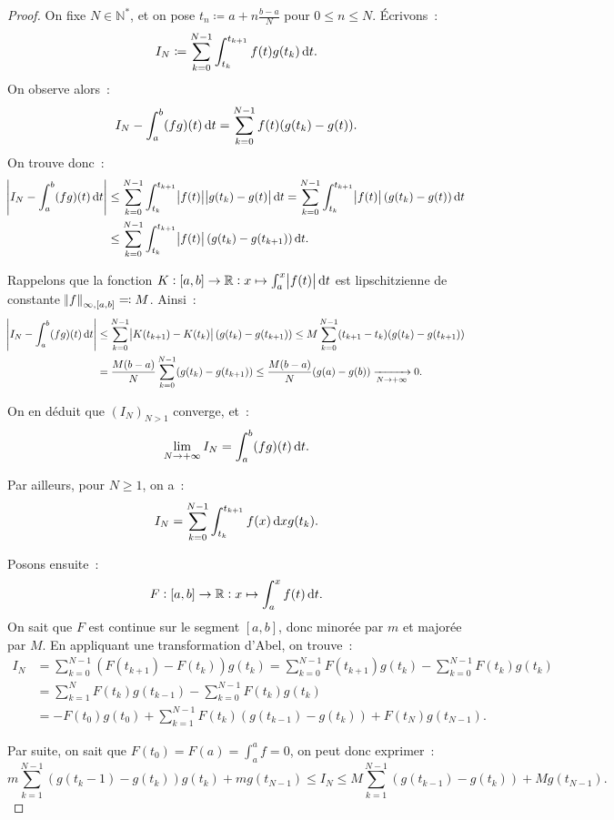\documentclass{report}
\theoremstyle{definition}
\theoremstyle{remark}
\newcommand{\R}{\mathbb R}
\newcommand{\N}{\mathbb N}
\newcommand{\Ns}{\N^{*}}
\newcommand{\pinfty}{{+\infty}}
\begin{document}
			\begin{proof} On fixe $N \in \Ns$, et on pose $t_n \coloneqq a + n\frac {b-a}N$ pour $0 \leq n \leq N$. Écrivons~:
			\[I_N \coloneqq \sum_{k=0}^{N-1}\int_{t_k}^{t_{k+1}}f(t)g(t_k)\dif t.\]
			On observe alors~:
			\[I_N - \int_a^b(fg)(t)\dif t = \sum_{k=0}^{N-1}f(t)(g(t_k) - g(t)).\]
			On trouve donc~:
			\begin{align*}
				\abs {I_N - \int_a^b(fg)(t)\dif t} &\leq \sum_{k=0}^{N-1} \int_{t_k}^{t_{k+1}}\abs {f(t)}\abs {g(t_k) - g(t)}\dif t
					= \sum_{k=0}^{N-1}\int_{t_k}^{t_{k+1}}\abs {f(t)}(g(t_k) - g(t))\dif t \\
				&\leq \sum_{k=0}^{N-1}\int_{t_k}^{t_{k+1}}\abs {f(t)}(g(t_k)-g(t_{k+1}))\dif t.
			\end{align*}

			Rappelons que la fonction $K : [a, b] \to \R : x \mapsto \int_a^x\abs {f(t)}\dif t$ est lipschitzienne de constante $\norm f_{\infty, [a, b]} \eqqcolon M$.
			Ainsi~:
			\begin{align*}
				\abs {I_N - \int_a^b(fg)(t)\dif t} &\leq \sum_{k=0}^{N-1}\abs {K(t_{k+1}) - K(t_k)}(g(t_k)-g(t_{k+1}))
					\leq M\sum_{k=0}^{N-1}(t_{k+1}-t_k)(g(t_k)-g(t_{k+1})) \\
				&= \frac {M(b-a)}N\sum_{k=0}^{N-1}(g(t_k) - g(t_{k+1})) \leq \frac {M(b-a)}N(g(a)-g(b)) \xrightarrow[N \to \pinfty]{} 0.
			\end{align*}

			On en déduit que $(I_N)_{N > 1}$ converge, et~:
			\[\lim_{N \to \pinfty}I_N = \int_a^b(fg)(t)\dif t.\]

			Par ailleurs, pour $N \geq 1$, on a~:
			\[I_N = \sum_{k=0}^{N-1}\int_{t_k}^{t_{k+1}}f(x)\dif xg(t_k).\]

			Posons ensuite~:
			\[F : [a, b] \to \R : x \mapsto \int_a^xf(t)\dif t.\]
			On sait que $F$ est continue sur le segment $[a, b]$, donc minorée par $m$ et majorée par $M$. En appliquant une transformation d'Abel, on trouve~:
			\begin{align*}
				I_N &= \sum_{k=0}^{N-1}\left(F(t_{k+1}) - F(t_k)\right)g(t_k) = \sum_{k=0}^{N-1}F(t_{k+1})g(t_k) - \sum_{k=0}^{N-1}F(t_k)g(t_k) \\
					&= \sum_{k=1}^NF(t_k)g(t_{k-1}) - \sum_{k=0}^{N-1}F(t_k)g(t_k) \\
					&= -F(t_0)g(t_0) + \sum_{k=1}^{N-1}F(t_k)\left(g(t_{k-1})-g(t_k)\right) + F(t_N)g(t_{N-1}).
			\end{align*}

			Par suite, on sait que $F(t_0) = F(a) = \int_a^a f = 0$, on peut donc exprimer~:
			\[m\sum_{k=1}^{N-1}\left(g(t_k-1)-g(t_k)\right)g(t_k) + mg(t_{N-1}) \leq I_N \leq M\sum_{k=1}^{N-1}\left(g(t_{k-1}) - g(t_k)\right) + Mg(t_{N-1}).\]


\end{proof}
\end{document}
